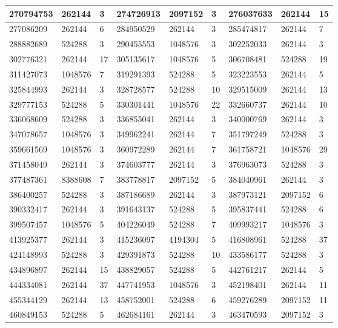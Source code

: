 \documentclass{article}
\begin{document}
\begin{longtable}{|l|l|l||l|l|l||l|l|l|}
\hline
270794753 & 262144 & 3 & 274726913 & 2097152 & 3 & 276037633 & 262144 & 15 \\
\hline
277086209 & 262144 & 6 & 284950529 & 262144 & 3 & 285474817 & 262144 & 7 \\
\hline
288882689 & 524288 & 3 & 290455553 & 1048576 & 3 & 302252033 & 262144 & 3 \\
\hline
302776321 & 262144 & 17 & 305135617 & 1048576 & 5 & 306708481 & 524288 & 19 \\
\hline
311427073 & 1048576 & 7 & 319291393 & 524288 & 5 & 323223553 & 262144 & 5 \\
\hline
325844993 & 262144 & 3 & 328728577 & 524288 & 10 & 329515009 & 262144 & 13 \\
\hline
329777153 & 524288 & 5 & 330301441 & 1048576 & 22 & 332660737 & 262144 & 10 \\
\hline
336068609 & 524288 & 3 & 336855041 & 262144 & 3 & 340000769 & 262144 & 3 \\
\hline
347078657 & 1048576 & 3 & 349962241 & 262144 & 7 & 351797249 & 524288 & 3 \\
\hline
359661569 & 1048576 & 3 & 360972289 & 262144 & 7 & 361758721 & 1048576 & 29 \\
\hline
371458049 & 262144 & 3 & 374603777 & 262144 & 3 & 376963073 & 524288 & 3 \\
\hline
377487361 & 8388608 & 7 & 383778817 & 2097152 & 5 & 384040961 & 262144 & 3 \\
\hline
386400257 & 524288 & 3 & 387186689 & 262144 & 3 & 387973121 & 2097152 & 6 \\
\hline
390332417 & 262144 & 3 & 391643137 & 524288 & 5 & 395837441 & 524288 & 6 \\
\hline
399507457 & 1048576 & 5 & 404226049 & 524288 & 7 & 409993217 & 1048576 & 3 \\
\hline
413925377 & 262144 & 3 & 415236097 & 4194304 & 5 & 416808961 & 524288 & 37 \\
\hline
424148993 & 524288 & 3 & 429391873 & 524288 & 10 & 433586177 & 524288 & 3 \\
\hline
434896897 & 262144 & 15 & 438829057 & 524288 & 5 & 442761217 & 262144 & 5 \\
\hline
444334081 & 262144 & 37 & 447741953 & 1048576 & 3 & 452198401 & 262144 & 11 \\
\hline
455344129 & 262144 & 13 & 458752001 & 524288 & 6 & 459276289 & 2097152 & 11 \\
\hline
460849153 & 524288 & 5 & 462684161 & 262144 & 3 & 463470593 & 2097152 & 3 \\

\end{longtable}
\end{document}
